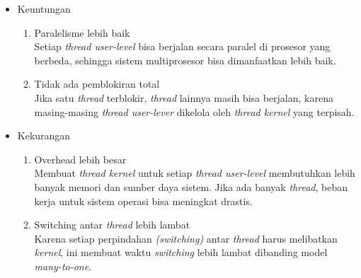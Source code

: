 \documentclass[12pt]{article}
\begin{document}
\begin{enumerate}
    \begin{itemize}
        \item Keuntungan \\
        \begin{enumerate}
            \item Paralelisme lebih baik \\
                Setiap \textit{thread user-level} bisa berjalan secara paralel di prosesor yang berbeda, sehingga sistem multiprosesor bisa dimanfaatkan lebih baik.
            \item Tidak ada pemblokiran total \\
                Jika satu \textit{thread} terblokir, \textit{thread} lainnya masih bisa berjalan, karena masing-masing \textit{thread user-lever} dikelola oleh \textit{thread kernel} yang terpisah.
        \end{enumerate}
        \item Kekurangan \\
        \begin{enumerate}
            \item Overhead lebih besar \\
                Membuat \textit{thread kernel} untuk setiap \textit{thread user-level} membutuhkan lebih banyak memori dan sumber daya sistem. Jika ada banyak \textit{thread}, beban kerja untuk sistem operasi bisa 
                meningkat drastis.
            \item Switching antar \textit{thread} lebih lambat \\
                Karena setiap perpindahan \textit{(switching)} antar \textit{thread} harus melibatkan \textit{kernel}, ini membuat waktu \textit{switching} lebih lambat dibanding model \textit{many-to-one}.
        \end{enumerate}
    \end{itemize}


\end{enumerate}
\end{document}
